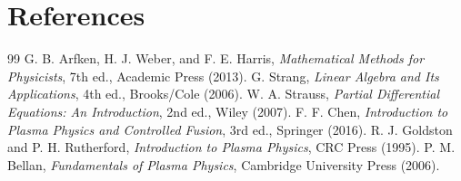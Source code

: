 \documentclass[11pt]{article}
\begin{document}
\section{References}
\begin{thebibliography}{99}
 G. B. Arfken, H. J. Weber, and F. E. Harris, \emph{Mathematical Methods for Physicists}, 7th ed., Academic Press (2013).
 G. Strang, \emph{Linear Algebra and Its Applications}, 4th ed., Brooks/Cole (2006).
 W. A. Strauss, \emph{Partial Differential Equations: An Introduction}, 2nd ed., Wiley (2007).
 F. F. Chen, \emph{Introduction to Plasma Physics and Controlled Fusion}, 3rd ed., Springer (2016).
 R. J. Goldston and P. H. Rutherford, \emph{Introduction to Plasma Physics}, CRC Press (1995).
 P. M. Bellan, \emph{Fundamentals of Plasma Physics}, Cambridge University Press (2006).
\end{thebibliography}
\end{document}
